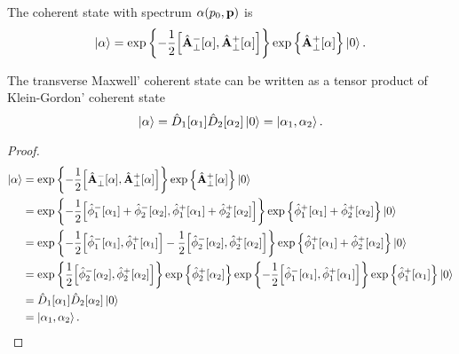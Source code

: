 \begin{definition}
	The coherent state with spectrum $\vb{\alpha}(p_0,\vb{p})$ is
	\begin{equation}
		\label{eq:qmw_coherent_state}
		\begin{split}
			\ket{\vb{\alpha}}
			=
			\exp\left\{
				-
				\frac{1}{2}
				\comm{\hat{\vb{A}}_\perp^-[\vb{\alpha}]}{\hat{\vb{A}}_\perp^+[\vb{\alpha}]}
			\right\}
			\exp\left\{
				\hat{\vb{A}}_\perp^+[\vb{\alpha}]
			\right\}
			\ket{0}
			.
		\end{split}
	\end{equation}
\end{definition}
\begin{lemma}\label{thm:qmw_qkg_coherent_state}
	The transverse Maxwell' coherent state can be written as a tensor product of Klein-Gordon' coherent state
	\begin{equation}
		\ket{\vb{\alpha}}
		=
		\hat{D}_1[\alpha_1]
		\hat{D}_2[\alpha_2]
		\ket{0}
		=
		\ket{\alpha_1,\alpha_2}
		.
	\end{equation}
\end{lemma}
\begin{proof}
	\begin{equation*}
		\begin{split}
			\ket{\vb{\alpha}}
			&=
			\exp\left\{
				-
				\frac{1}{2}
				\comm{\hat{\vb{A}}_\perp^-[\vb{\alpha}]}{\hat{\vb{A}}_\perp^+[\vb{\alpha}]}
			\right\}
			\exp\left\{
				\hat{\vb{A}}_\perp^+[\vb{\alpha}]
			\right\}
			\ket{0}
			\\
			&=
			\exp\left\{
				-
				\frac{1}{2}
				\comm{
					\hat\phi_1^-[\alpha_1]
					+
					\hat\phi_2^-[\alpha_2]
				}{
					\hat\phi_1^+[\alpha_1]
					+
					\hat\phi_2^+[\alpha_2]
				}
			\right\}
			\exp\left\{
				\hat\phi_1^+[\alpha_1]
				+
				\hat\phi_2^+[\alpha_2]
			\right\}
			\ket{0}
			\\
			&=
			\exp\left\{
				-
				\frac{1}{2}
				\comm{\hat\phi_1^-[\alpha_1]}{\hat\phi_1^+[\alpha_1]}
				-
				\frac{1}{2}
				\comm{\hat\phi_2^-[\alpha_2]}{\hat\phi_2^+[\alpha_2]}
			\right\}
			\exp\left\{
				\hat\phi_1^+[\alpha_1]
				+
				\hat\phi_2^+[\alpha_2]
			\right\}
			\ket{0}
			\\
			&=
			\exp\left\{
				\frac{1}{2}
				\comm{\hat\phi_2^-[\alpha_2]}{\hat\phi_2^+[\alpha_2]}
			\right\}
			\exp\left\{
				\hat\phi_2^+[\alpha_2]
			\right\}
			\exp\left\{
				-
				\frac{1}{2}
				\comm{\hat\phi_1^-[\alpha_1]}{\hat\phi_1^+[\alpha_1]}
			\right\}
			\exp\left\{
				\hat\phi_1^+[\alpha_1]
			\right\}
			\ket{0}
			\\
			&=
			\hat{D}_1[\alpha_1]
			\hat{D}_2[\alpha_2]
			\ket{0}
			\\
			&=
			\ket{\alpha_1,\alpha_2}
			.
		\end{split}
	\end{equation*}
\end{proof}

